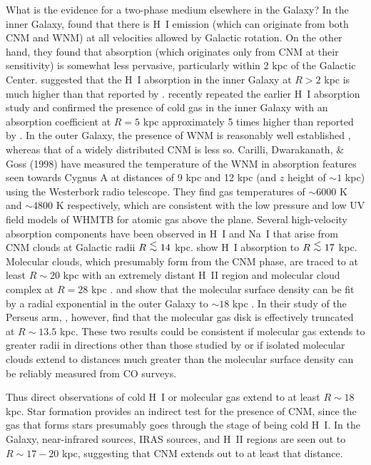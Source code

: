 \documentclass[12pt,preprint,flushrt]{aastex}
\newcommand{\al}{\mbox{ \raisebox{-.4ex}{$\stackrel{\textstyle <}{\sim}$} }}
\begin{document}
What is the evidence for a two-phase medium
elsewhere in the Galaxy?
In the inner Galaxy, \cite{gar89} found that there is H~I emission
(which can originate from both CNM and WNM) at all velocities
allowed by Galactic rotation.  On the other hand, they found
that absorption (which originates only from CNM at their
sensitivity) is somewhat less pervasive, particularly within
2 kpc of the Galactic Center. \cite{liszt93} suggested that the 
H~I absorption in the inner Galaxy at $R >  2$ kpc is much higher
than that reported by \cite{gar89}. \cite{kol01}
recently repeated  the earlier H~I absorption  study and confirmed 
the presence of cold gas in the inner Galaxy with an absorption 
coefficient at $R=5$ kpc approximately 5 times higher than reported by
\cite{gar89}. 
In the outer Galaxy, the
presence of WNM is reasonably well
established \citep{kul87}, whereas that of a widely distributed
CNM is less so. Carilli, Dwarakanath, \& Goss (1998) have measured the
temperature of the WNM in absorption
features seen towards Cygnus A at distances of 9 kpc and 12 kpc
(and $z$ height of $\sim 1$ kpc) using the Westerbork radio telescope.
They find gas temperatures of $\sim 6000$ K and $\sim 4800$ K respectively,
which are consistent with the low pressure
and low UV field models of WHMTB for atomic gas above
the plane. Several high-velocity absorption components have
been observed in H~I \citep{col88} and Na~I \citep{semb94} that
arise from CNM clouds at Galactic radii $R\al 14$ kpc.
\cite{kol01} show H~I absorption to $R\al 17$ kpc.
Molecular clouds,  which presumably
form from the CNM phase, are traced to at least $R\sim 20$ kpc
\citep{wou89,hey01} with an extremely distant H~II region
and molecular cloud complex at $R=28$ kpc \citep{dig94}.
\cite{wou90} and \cite{bron00} show that the molecular surface density
can be fit by a radial exponential in the outer Galaxy to  $\sim 18$ kpc
\cite[see also][]{wil97}.   In their study of the Perseus arm,
\cite{hey98}, however, find that the molecular gas disk
is effectively truncated at $R\sim 13.5$ kpc.  These two results
could be consistent if molecular gas extends to greater
radii in directions other than those studied by \cite{hey98} or if 
isolated molecular clouds extend to distances much greater than 
the molecular surface density can be reliably measured from CO surveys.

Thus direct observations of cold H~I or molecular gas extend to
at least $R\sim 18$ kpc. Star formation provides an indirect test 
for the presence of CNM,
since the gas that forms stars presumably goes through the stage of being
cold H~I.  In the Galaxy, near-infrared sources, IRAS sources, 
and H~II regions
\citep{wou90,rud96, kor00,snell02} are seen out to $R\sim 17-20$ kpc, 
suggesting that CNM extends out to at least that distance. 
\end{document}
